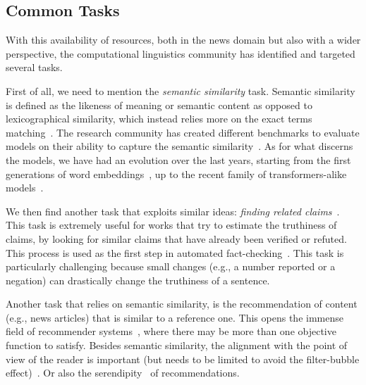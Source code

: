 \subsection{Common Tasks}
\label{ssec:lit_relationships_tasks}

With this availability of resources, both in the news domain but also with a wider perspective, the computational linguistics community has identified and targeted several tasks.

First of all, we need to mention the \textit{semantic similarity} task.
Semantic similarity is defined as the likeness of meaning or semantic content as opposed to lexicographical similarity, which instead relies more on the exact terms matching~\citep{harispe2015semantic}.
The research community has created different benchmarks to evaluate models on their ability to capture the semantic similarity~\citep{conneau-kiela-2018-senteval,chandrasekaran2021evolution}.
As for what discerns the models, we have had an evolution over the last years, starting from the first generations of word embeddings~\citep{pennington2014glove,mikolov2013efficient}, up to the recent family of transformers-alike models~\citep{devlin2018bert,cer2018universal,yang2019xlnet,reimers2019sentence}.

We then find another task that exploits similar ideas: \emph{finding related claims}~\citep{almeida2020text}.
This task is extremely useful for works that try to estimate the truthiness of claims, by looking for similar claims that have already been verified or refuted. This process is used as the first step in automated fact-checking~\citep{nakov2021automated,guo2022survey}. This task is particularly challenging because small changes (e.g., a number reported or a negation) can drastically change the truthiness of a sentence.


Another task that relies on semantic similarity, is the recommendation of content (e.g., news articles) that is similar to a reference one.
This opens the immense field of recommender systems~\citep{tintarev2006similarity,karimi2018news,feng2020news}, where there may be more than one objective function to satisfy.
Besides semantic similarity, the alignment with the point of view of the reader is important (but needs to be limited to avoid the filter-bubble effect)~\citep{lunardi2020metric,nguyen2014exploring,lunardi2019representing}.
Or also the serendipity~\citep{ziarani2021serendipity,abdollahpouri2021toward,raza2022news} of recommendations.

